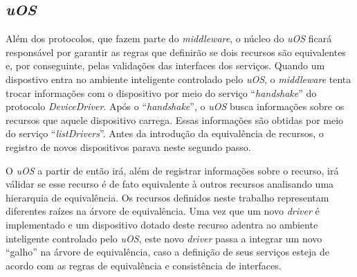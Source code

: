 \subsection{\emph{uOS}}

Além dos protocolos, que fazem parte do \emph{middleware}, o núcleo do \emph{uOS} ficará responsável por garantir as regras que definirão se dois recursos são equivalentes e, por conseguinte, pelas validações das interfaces dos serviços. Quando um dispostivo entra no ambiente inteligente controlado pelo \emph{uOS}, o \emph{middleware} tenta trocar informações com o dispositivo por meio do serviço ``\emph{handshake}'' do protocolo \emph{DeviceDriver}. Após o ``\emph{handshake}'', o \emph{uOS} busca informações sobre os recursos que aquele dispositivo carrega. Essas informações são obtidas por meio do serviço ``\emph{listDrivers}''. Antes da introdução da equivalência de recursos, o registro de novos dispositivos parava neste segundo passo. 

O \emph{uOS} a partir de então irá, além de registrar informações sobre o recurso, irá válidar se esse recurso é de fato equivalente à outros recursos analisando uma hierarquia de equivalência. Os recursos definidos neste trabalho representam diferentes raízes na árvore de equivalência. Uma vez que um novo \emph{driver} é implementado e um dispositivo dotado deste recurso adentra ao ambiente inteligente controlado pelo \emph{uOS}, este novo \emph{driver} passa a integrar um novo ``galho'' na árvore de equivalência, caso a definição de seus serviços esteja de acordo com as regras de equivalência e consistência de interfaces.